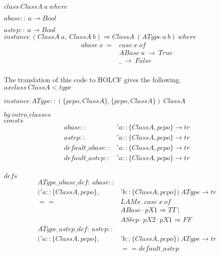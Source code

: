 \documentclass{llncs}
\begin{document}
\noindent $class \ ClassA \ a \ where$

$abase :: \ a \to Bool $
 
$ astep :: \ a \to Bool $\\

\noindent $instance \ (ClassA \ a, \ ClassA \ b) \Rightarrow ClassA \ (AType \ a \ b) \ where $
$$\begin{array}{ll}
abase \ x \ = & case \ x \ of \\
           &  ABase \ u \ \to \ True \\
            & \_ \ \to \ False \\
\end{array}$$

\noindent The translation of this code to HOLCF gives the following.\\

\noindent $axclass \ ClassA < type$

\noindent $instance \ AType::(\{pcpo, ClassA\}, \{pcpo, ClassA\}) \ ClassA$ 


$by \ intro\_classes$\\

\noindent $consts$
$$\begin{array}{ll}
abase :: & 'a::\{ClassA, pcpo\} \to tr \\
astep :: & 'a::\{ClassA, pcpo\} \to tr \\
default\_abase :: & 'a::\{ClassA, pcpo\} \to tr \\
default\_astep :: & 'a::\{ClassA, pcpo\} \to tr \\
\end{array}$$

\noindent $defs$
$$\begin{array}{rl}
AType\_abase\_def : \ abase :: & \\
  ('a::\{ClassA, pcpo\}, & 'b::\{ClassA, pcpo\}) \ AType \to tr \\
                                   == & LAM x. \ case \ x \ of \\
                                  &  ABase \cdot pX1 \Rightarrow TT \ | \\
                                  &  AStep \cdot pX2 \cdot pX1 \Rightarrow FF \\
AType\_astep\_def : \ astep :: & \\
    ('a::\{ClassA, pcpo\}, & 'b::\{ClassA, pcpo\}) \ AType \to tr \\
                         & == default\_astep \\
\end{array}$$ 
\end{document}
